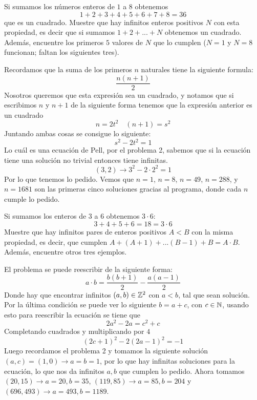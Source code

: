 \begin{prob}[3 pts.]
	Si sumamos los números enteros de $1$ a $8$ obtenemos
	\[1+2+3+4+5+6+7+8=36\]
	que es un cuadrado. Muestre que hay infinitos enteros positivos $N$ con esta propiedad, es decir que si sumamos $1+2+...+N$ obtenemos un cuadrado. Además, encuentre los primeros $5$ valores de $N$ que lo cumplen ($N=1$ y $N=8$ funcionan; faltan los siguientes tres).
\end{prob}

\begin{sol}
	Recordamos que la suma de los primeros $n$ naturales tiene la siguiente formula:
	\[
		\frac{n(n+1)}2
	\]
	Nosotros queremos que esta expresión sea un cuadrado, y notamos que si escribimos $n$ y $n+1$ de la siguiente forma tenemos que la expresión anterior es un cuadrado
	\[
		n=2t^2\quad(n+1)=s^2
	\]
	Juntando ambas cosas se consigue lo siguiente:
	\[
		s^2-2t^2=1
	\]
	Lo cuál es una ecuación de Pell, por el problema 2, sabemos que si la ecuación tiene una solución no trivial entonces tiene infinitas.
	\[
		(3,2)\rightarrow 3^2-2\cdot2^2=1
	\]
	Por lo que tenemos lo pedido. Vemos que $n=1$, $n=8$, $n=49$, $n=288$, y $n=1681$ son las primeras cinco soluciones gracias al programa\cite{prog}, donde cada $n$ cumple lo pedido.
\end{sol}

\begin{prob}[3 pts]
	Si sumamos los enteros de $3$ a $6$ obtenemos $3\cdot 6$:
	\[3+4+5+6=18=3\cdot 6\]
	Muestre que hay infinitos pares de enteros positivos $A<B$ con la misma propiedad, es decir, que cumplen $A+(A+1)+...(B-1)+B=A\cdot B$. Además, encuentre otros tres ejemplos.
\end{prob}

\begin{sol}
	El problema se puede reescribir de la siguiente forma:
	\[
		a\cdot b=\frac{b(b+1)}2-\frac{a(a-1)}2
	\]
	Donde hay que encontrar infinitos $(a,b)\in\mathbb{Z}^2$ con $a<b$, tal que sean solución. Por la última condición se puede ver lo siguiente $b=a+c$, con $c\in\mathbb{N}$, usando esto para reescribir la ecuación se tiene que
	\[
		2a^2-2a=c^2+c
	\]
	Completando cuadrados y multiplicando por $4$
	\[
		(2c+1)^2-2(2a-1)^2=-1
	\]
	Luego recordamos el problema 2 y tomamos la siguiente solución $(a,c)=(1,0)\rightarrow a=b=1$, por lo que hay infinitas soluciones para la ecuación, lo que nos da infinitos $a,b$ que cumplen lo pedido. Ahora tomamos $(20,15)\rightarrow a=20, b=35$, $(119,85)\rightarrow a=85, b=204$ y $(696,493)\rightarrow a=493, b=1189$.
\end{sol}




